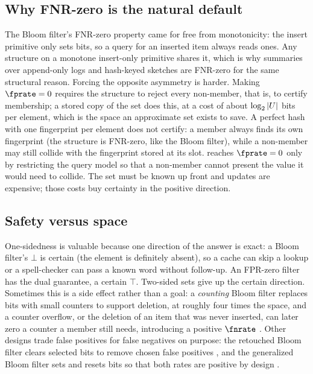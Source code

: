 \subsection*{Why FNR-zero is the natural default}

The Bloom filter's FNR-zero property came for free from monotonicity: the
insert primitive only sets bits, so a query for an inserted item always
reads ones. Any structure on a monotone insert-only primitive shares it,
which is why summaries over append-only logs and hash-keyed sketches are
FNR-zero for the same structural reason. Forcing the opposite asymmetry is
harder. Making $\fprate = 0$ requires the structure to reject every
non-member, that is, to certify membership; a stored copy of the set does
this, at a cost of about $\log_2 |U|$ bits per element, which is
the space an approximate set exists to save. A perfect hash with one
fingerprint per element does not certify: a member always finds its own
fingerprint (the structure is FNR-zero, like the Bloom filter), while a
non-member may still collide with the fingerprint stored at its slot.
 reaches $\fprate = 0$ only by restricting the
query model so that a non-member cannot present the value it would need to
collide. The set must be known up front and updates are expensive; those
costs buy certainty in the positive direction.

\subsection*{Safety versus space}

One-sidedness is valuable because one direction of the answer is exact: a
Bloom filter's $\bot$ is certain (the element is definitely absent), so a
cache can skip a lookup or a spell-checker can pass a known word without
follow-up. An FPR-zero filter has the dual guarantee, a certain $\top$.
Two-sided sets give up the certain direction.
Sometimes this is a side effect rather than a goal: a \emph{counting} Bloom
filter \parencite{fan-et-al-2000} replaces bits with small counters to
support deletion, at roughly four times the space, and a counter overflow, or
the deletion of an item that was never inserted, can later zero a counter a
member still needs, introducing a positive $\fnrate$
\parencite{guo-et-al-2010}. Other designs trade false positives for false
negatives on purpose: the retouched Bloom filter clears selected bits to
remove chosen false positives \parencite{donnet-baynat-friedman-2006}, and
the generalized Bloom filter sets and resets bits so that both rates are
positive by design \parencite{laufer-velloso-duarte-2011}.

